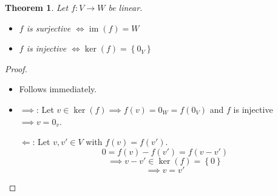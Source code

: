 \documentclass[a4paper,landscape,twocolumn]{article}
\newcommand\set[1]{\left\{#1\right\}}
\newtheorem{theorem}{Theorem}[section]
\DeclareMathOperator\image{im} %
\DeclareMathOperator\kernel{ker} %
\begin{document}
\begin{theorem}
  \label{satz-5-20}
  Let $f: V \rightarrow W$ be linear.
  \begin{itemize}
    \item $f$ is surjective $\iff \image(f) = W$
    \item $f$ is injective $\iff \kernel(f) = \set{0_V}$
  \end{itemize}
\end{theorem}
\begin{proof}
  \begin{itemize}
    \item Follows immediately.
    \item $\implies$: Let $v \in \kernel(f) \implies f(v) = 0_W = f(0_V)$
      and $f$ is injective $\implies v = 0_v$.

      $\Leftarrow$: Let $v,v' \in V$ with $f(v) = f(v')$.
      \[ 0 = f(v) - f(v') = f(v - v') \]
      \[ \implies v - v' \in \kernel(f) = \set{0} \]
      \[ \implies v = v' \]
  \end{itemize}
\end{proof}
\end{document}
